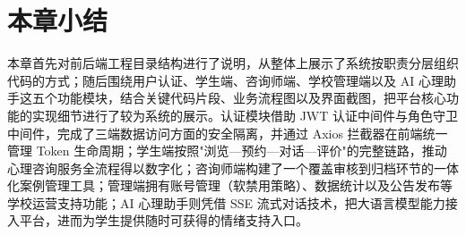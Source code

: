 \section*{本章小结}

本章首先对前后端工程目录结构进行了说明，从整体上展示了系统按职责分层组织代码的方式；随后围绕用户认证、学生端、咨询师端、学校管理端以及 AI 心理助手这五个功能模块，结合关键代码片段、业务流程图以及界面截图，把平台核心功能的实现细节进行了较为系统的展示。认证模块借助 JWT 认证中间件与角色守卫中间件，完成了三端数据访问方面的安全隔离，并通过 Axios 拦截器在前端统一管理 Token 生命周期；学生端按照"浏览—预约—对话—评价"的完整链路，推动心理咨询服务全流程得以数字化；咨询师端构建了一个覆盖审核到归档环节的一体化案例管理工具；管理端拥有账号管理（软禁用策略）、数据统计以及公告发布等学校运营支持功能；AI 心理助手则凭借 SSE 流式对话技术，把大语言模型能力接入平台，进而为学生提供随时可获得的情绪支持入口。
